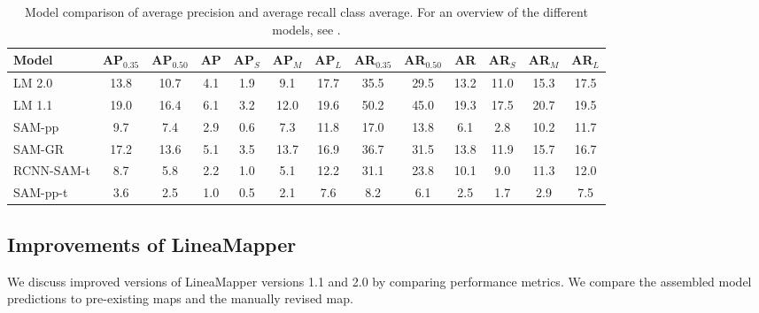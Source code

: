 \begin{table*}%
\centering
\caption{Model comparison of average precision and average recall class average. For an overview of the different models, see .}
\label{tab:segm_comparison}
\begin{tabular}{@{}lcccccc|cccccc@{}}
\toprule
Model & AP$_{0.35}$ & AP$_{0.50}$ & AP & AP$_S$ & AP$_M$ & AP$_L$ & AR$_{0.35}$ & AR$_{0.50}$ & AR & AR$_S$ & AR$_M$ & AR$_L$ \\ \midrule
LM 2.0 & 13.8 & 10.7 & 4.1 & 1.9 & 9.1 & 17.7 & 35.5 & 29.5 & 13.2 & 11.0 & 15.3 & 17.5 \\
LM 1.1 & 19.0 & 16.4 & 6.1 & 3.2 & 12.0 & 19.6 & 50.2 & 45.0 & 19.3 & 17.5 & 20.7 & 19.5 \\
SAM-pp & 9.7 & 7.4 & 2.9 & 0.6 & 7.3 & 11.8 & 17.0 & 13.8 & 6.1 & 2.8 & 10.2 & 11.7 \\
SAM-GR & 17.2 & 13.6 & 5.1 & 3.5 & 13.7 & 16.9 & 36.7 & 31.5 & 13.8 & 11.9 & 15.7 & 16.7 \\
RCNN-SAM-t & 8.7 & 5.8 & 2.2 & 1.0 & 5.1 & 12.2 & 31.1 & 23.8 & 10.1 & 9.0 & 11.3 & 12.0 \\
SAM-pp-t & 3.6 & 2.5 & 1.0 & 0.5 & 2.1 & 7.6 & 8.2 & 6.1 & 2.5 & 1.7 & 2.9 & 7.5 \\ \bottomrule
\end{tabular}
\end{table*}

\subsection{Improvements of LineaMapper}\label{sec:lineamapper_compar}
We discuss improved versions of LineaMapper versions 1.1 and 2.0 by comparing performance metrics. We compare the assembled model predictions to pre-existing maps and the manually revised map.

